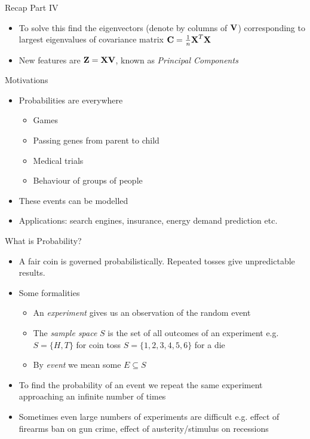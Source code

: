 \documentclass{beamer}
\begin{document}
\begin{frame}{Recap Part IV} 
\begin{itemize} 
 \item To solve this find the eigenvectors (denote by columns of $\textbf{V}$) corresponding to largest eigenvalues of covariance matrix $\textbf{C} = \frac{1}{n}\textbf{X}^T\textbf{X}$ 
 \item New features are $\textbf{Z} = \textbf{X}\textbf{V}$, known as \emph{Principal Components}
\end{itemize}
\end{frame}


\begin{frame}{Motivations}
\begin{itemize} 
 \item Probabilities are everywhere 
 \begin{itemize}
 \item Games
 \item Passing genes from parent to child 
 \item Medical trials
 \item Behaviour of groups of people 
 \end{itemize} 
\item These events can be modelled 
\item Applications: search engines, insurance, energy demand prediction etc. 
\end{itemize}
\end{frame}

\begin{frame}{What is Probability?} 
\begin{itemize}
 \item A fair coin is governed probabilistically. Repeated tosses give unpredictable results. 
 \item Some formalities 
 \begin{itemize}
 \item An \emph{experiment} gives us an observation of the random event
 \item The \emph{sample space} $S$ is the set of all outcomes of an experiment e.g. $S = \{H, T\}$ for coin toss $S = \{1,2,3,4,5,6\}$ for a die  
 \item By \emph{event} we mean some $E \subseteq S$ 
 \end{itemize} 
 \item To find the probability of an event we repeat the same experiment approaching an infinite number of times 
 \item Sometimes even large numbers of experiments are difficult e.g. effect of firearms ban on gun crime, effect of austerity/stimulus on recessions 
\end{itemize}
\end{frame}
\end{document}
